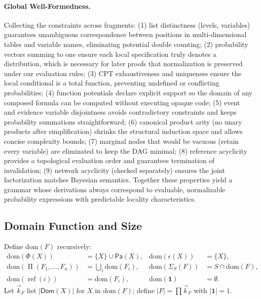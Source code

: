 \documentclass[11pt]{article}
\newcommand{\Dom}{\mathsf{Dom}}
\newcommand{\Pa}{\mathsf{Pa}}
\newcommand{\fref}[1]{\operatorname{ref}(#1)}
\newcommand{\Prod}{\operatorname{\Pi}}
\newcommand{\Unit}{\mathbf{1}}
\newcommand{\Potf}{\Phi}
\newcommand{\Evid}{\epsilon}
\begin{document}
\paragraph{Global Well-Formedness.} Collecting the constraints across fragments: (1) list distinctness (levels, variables) guarantees unambiguous correspondence between positions in multi-dimensional tables and variable names, eliminating potential double counting; (2) probability vectors summing to one ensure each local specification truly denotes a distribution, which is necessary for later proofs that normalization is preserved under our evaluation rules; (3) CPT exhaustiveness and uniqueness ensure the local conditional is a total function, preventing undefined or conflicting probabilities; (4) function potentials declare explicit support so the domain of any composed formula can be computed without executing opaque code; (5) event and evidence variable disjointness avoids contradictory constraints and keeps probability summations straightforward; (6) canonical product arity (no unary products after simplification) shrinks the structural induction space and allows concise complexity bounds; (7) marginal nodes that would be vacuous (retain every variable) are eliminated to keep the DAG minimal; (8) reference acyclicity provides a topological evaluation order and guarantees termination of invalidation; (9) network acyclicity (checked separately) ensures the joint factorization matches Bayesian semantics. Together these properties yield a grammar whose derivations always correspond to evaluable, normalizable probability expressions with predictable locality characteristics.

\subsection{Domain Function and Size}
Define $\mathrm{dom}(F)$ recursively:
\begin{align*}
\mathrm{dom}(\Potf(X)) &= \{X\}\cup \Pa(X), & \mathrm{dom}(\Evid(X)) &= \{X\},\\
\mathrm{dom}(\Prod(F_1,\dots,F_n)) &= \bigcup_i \mathrm{dom}(F_i), & \mathrm{dom}(\Sigma_S(F)) &= S\cap \mathrm{dom}(F),\\
\mathrm{dom}(\fref{i}) &= \mathrm{dom}(F_i), & \mathrm{dom}(\Unit) &= \emptyset.
\end{align*}
Let $\vec{k}_F$ list $|\Dom(X)|$ for $X$ in $\mathrm{dom}(F)$; define $|F|=\prod \vec{k}_F$ with $|\Unit|=1$.
\end{document}
